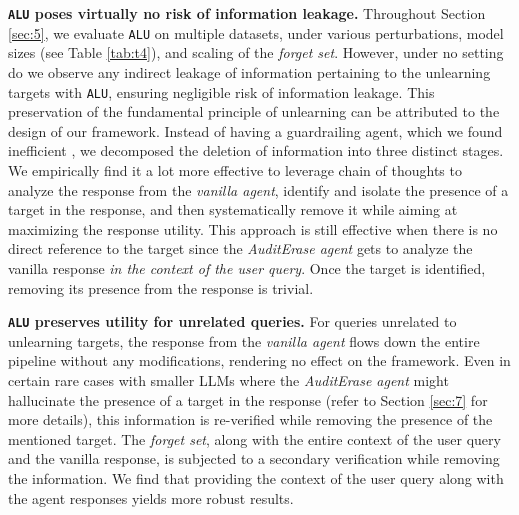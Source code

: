 \textbf{\texttt{ALU} poses virtually no risk of information leakage.}
Throughout Section \ref{sec:5}, we evaluate \texttt{ALU} on multiple datasets, under various perturbations, model sizes (see Table \ref{tab:t4}), and scaling of the \emph{forget set}. However, under no setting do we observe any indirect leakage of information pertaining to the unlearning targets with \texttt{ALU}, ensuring negligible risk of information leakage. This preservation of the fundamental principle of unlearning can be attributed to the design of our framework. Instead of having a guardrailing agent, which we found inefficient \cite{thaker2024guardrail}, we decomposed the deletion of information into three distinct stages. We empirically find it a lot more effective to leverage chain of thoughts \cite{wei2023chainofthoughtpromptingelicitsreasoning} to analyze the response from the \emph{vanilla agent}, identify and isolate the presence of a target in the response, and then systematically remove it while aiming at maximizing the response utility. This approach is still effective when there is no direct reference to the target since the \emph{AuditErase agent} gets to analyze the vanilla response \textit{in the context of the user query}. Once the target is identified, removing its presence from the response is trivial.

\textbf{\texttt{ALU} preserves utility for unrelated queries.}
For queries unrelated to unlearning targets, the response from the \emph{vanilla agent} flows down the entire pipeline without any modifications, rendering no effect on the framework. Even in certain rare cases with smaller LLMs where the \emph{AuditErase agent} might hallucinate the presence of a target in the response (refer to Section \ref{sec:7} for more details), this information is re-verified while removing the presence of the mentioned target. The \emph{forget set}, along with the entire context of the user query and the vanilla response, is subjected to a secondary verification while removing the information. We find that providing the context of the user query along with the agent responses yields more robust results. 


